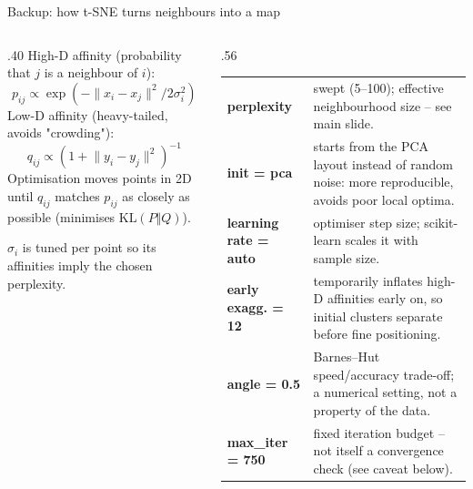 \documentclass[aspectratio=169,10pt]{beamer}
\begin{document}
\begin{frame}{Backup: how t-SNE turns neighbours into a map}
  \begin{columns}[T,onlytextwidth]
  \begin{column}{.40\textwidth}
    \small
    \setlength{\abovedisplayskip}{2pt}\setlength{\belowdisplayskip}{2pt}
    High-D affinity (probability that $j$ is a neighbour of $i$):
    \[p_{ij}\propto\exp(-\lVert x_i-x_j\rVert^2/2\sigma_i^2)\]
    Low-D affinity (heavy-tailed, avoids "crowding"):
    \[q_{ij}\propto(1+\lVert y_i-y_j\rVert^2)^{-1}\]
    Optimisation moves points in 2D until $q_{ij}$ matches $p_{ij}$ as closely as possible (minimises $\mathrm{KL}(P\Vert Q)$).\par\smallskip
    $\sigma_i$ is tuned per point so its affinities imply the chosen perplexity.
  \end{column}
  \begin{column}{.56\textwidth}
    \scriptsize
    \begin{tabular}{@{}>{\raggedright\arraybackslash}p{.32\linewidth}@{\hspace{2mm}}>{\raggedright\arraybackslash}p{}@{}}\toprule
      \textbf{perplexity} & swept (5--100); effective neighbourhood size -- see main slide.\\
      \textbf{init = pca} & starts from the PCA layout instead of random noise: more reproducible, avoids poor local optima.\\
      \textbf{learning rate = auto} & optimiser step size; scikit-learn scales it with sample size.\\
      \textbf{early exagg. = 12} & temporarily inflates high-D affinities early on, so initial clusters separate before fine positioning.\\
      \textbf{angle = 0.5} & Barnes--Hut speed/accuracy trade-off; a numerical setting, not a property of the data.\\
      \textbf{max\_iter = 750} & fixed iteration budget -- not itself a convergence check (see caveat below).\\\bottomrule
    \end{tabular}
  \end{column}
  \end{columns}
\end{frame}
\end{document}
